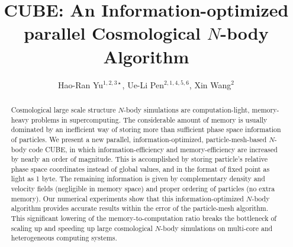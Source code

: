 \documentclass[10pt,twocolumn,reprint]{emulateapj}
\begin{document}
\title{CUBE: An Information-optimized parallel Cosmological $N$-body Algorithm}
\author{
Hao-Ran Yu$^{1,2,3\star}$,
Ue-Li Pen$^{2,1,4,5,6}$,
Xin Wang$^{2}$
}



\begin{abstract}
Cosmological large scale structure $N$-body simulations are computation-light, memory-heavy problems in supercomputing. The considerable amount of memory is usually dominated by an inefficient way of storing more than sufficient phase space information of particles. We present a new parallel, information-optimized, particle-mesh-based $N$-body code CUBE, in which information-efficiency and memory-efficiency are increased by nearly an order of magnitude. This is accomplished by storing particle's relative phase space coordinates instead of global values, and in the format of fixed point as light as 1 byte. The remaining information is given by complementary density and velocity fields (negligible in memory space) and proper ordering of particles (no extra memory). Our numerical experiments show that this information-optimized $N$-body algorithm provides accurate results within the error of the particle-mesh algorithm. This significant lowering of the memory-to-computation ratio breaks the bottleneck of scaling up and speeding up large cosmological $N$-body simulations on multi-core and heterogeneous computing systems.

\end{abstract}

\keywords{}

\maketitle
\end{document}
